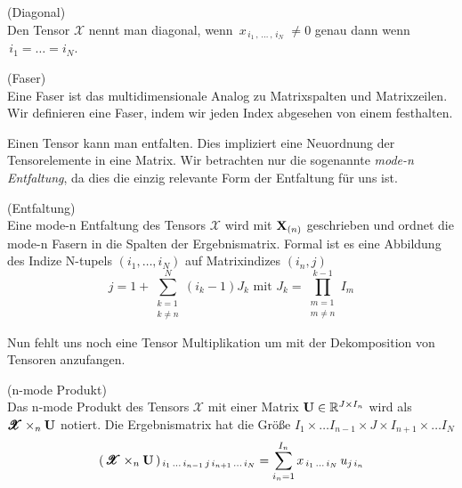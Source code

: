 \begin{Definition} (Diagonal) \\
Den Tensor $\pmb{\mathscr{X}}$ nennt man diagonal, wenn
$\, x_{ \, i_1 \,, \, \dots \, , \, i_N \, } \, \neq 0$ genau dann wenn \\ $\, i_1 = \dots = i_N$.
\end{Definition}

\begin{Definition} (Faser) \\
Eine Faser ist das multidimensionale Analog zu Matrixspalten und Matrixzeilen. Wir definieren eine Faser, indem wir jeden Index abgesehen von einem festhalten.
\end{Definition}

Einen Tensor kann man entfalten. Dies impliziert eine Neuordnung der Tensorelemente in eine Matrix.
Wir betrachten nur die sogenannte \textit{mode-n Entfaltung}, da dies die einzig relevante Form der Entfaltung für uns ist.

\begin{Bemerkung} (Entfaltung) \\
Eine mode-n Entfaltung des Tensors $\pmb{\mathscr{X}}$ wird mit $\bold{X}_{(n)}$ geschrieben und ordnet die mode-n Fasern in die Spalten der Ergebnismatrix.
Formal ist es eine Abbildung des Indize N-tupels $(i_1,\dots,i_N)$ auf Matrixindizes $(i_n,j) $
\begin{equation}
j=1+\sum_{\substack{k=1 \\ k \neq n}}^{N} (i_k-1)J_k \text{ mit } J_k = \prod_{\substack{m=1 \\ m \neq n}}^{k-1} I_m
\end{equation}
\end{Bemerkung}

Nun fehlt uns noch eine Tensor Multiplikation um mit der Dekomposition von Tensoren anzufangen. 

\begin{Definition} (n-mode Produkt) \\
Das n-mode Produkt des Tensors $\pmb{\mathscr{X}}$ mit einer Matrix $\bold{U} \in \mathbb{R}^{J \times I_n}$ wird als $\pmb{\mathscr{X}} \times_n \bold{U}$ notiert. Die Ergebnismatrix hat die Größe $I_1 \times \dots I_{n-1} \times J \times I_{n+1} \times \dots I_N$
\begin{equation}
	(\, \pmb{\mathscr{X}} \times_n \bold{U} \, )_{\, i_1 \, \dots \, i_{n-1} \, j \, i_{n+1}\, \dots \, i_N} = \sum_{i_n = 1}^{I_n} x_{\, i_1 \, \dots \, i_N} \, u_{j \, i_n}
\end{equation}
\end{Definition}

